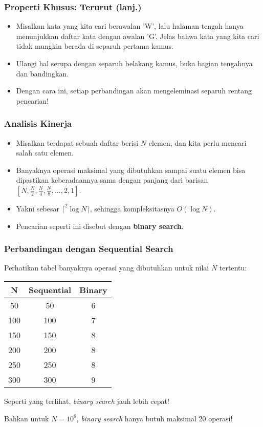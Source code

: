 \begin{frame}
\frametitle{Properti Khusus: Terurut (lanj.)}
\begin{itemize}
  \item Misalkan kata yang kita cari berawalan 'W', lalu halaman tengah hanya menunjukkan daftar kata dengan awalan 'G'. Jelas bahwa kata yang kita cari tidak mungkin berada di \alert{separuh pertama} kamus.
  \item Ulangi hal serupa dengan separuh belakang kamus, buka bagian tengahnya dan bandingkan.
  \item Dengan cara ini, setiap perbandingan akan mengeleminasi separuh rentang pencarian!
\end{itemize}
\end{frame}

\begin{frame}
\frametitle{Analisis Kinerja}
\begin{itemize}
  \item Misalkan terdapat sebuah daftar berisi $N$ elemen, dan kita perlu mencari salah satu elemen.
  \item Banyaknya operasi maksimal yang dibutuhkan sampai suatu elemen bisa dipastikan keberadaannya sama dengan panjang dari barisan $[N, \frac{N}{2}, \frac{N}{4}, \frac{N}{8}, ..., 2, 1]$.
  \item Yakni sebesar $\lceil ^2\log{N} \rceil$, sehingga kompleksitasnya $O(\log{N})$.
  \item Pencarian seperti ini disebut dengan \alert{\textbf{binary search}}.
\end{itemize}
\end{frame}

\begin{frame}
\frametitle{Perbandingan dengan Sequential Search}
Perhatikan tabel banyaknya operasi yang dibutuhkan untuk nilai $N$ tertentu:
\begin{table}[ht]
  \begin{tabular}{|c|c|c|}
    \hline N  & Sequential  & Binary \\
    \hline 50 & 50 & 6 \\
    \hline 100 & 100 & 7 \\
    \hline 150 & 150 & 8 \\
    \hline 200 & 200 & 8 \\
    \hline 250 & 250 & 8 \\
    \hline 300 & 300 & 9 \\
    \hline
  \end{tabular}
\end{table}
Seperti yang terlihat, \textit{binary search} jauh lebih cepat!

Bahkan untuk $N = 10^6$, \textit{binary search} hanya butuh maksimal 20 operasi!
\end{frame}

